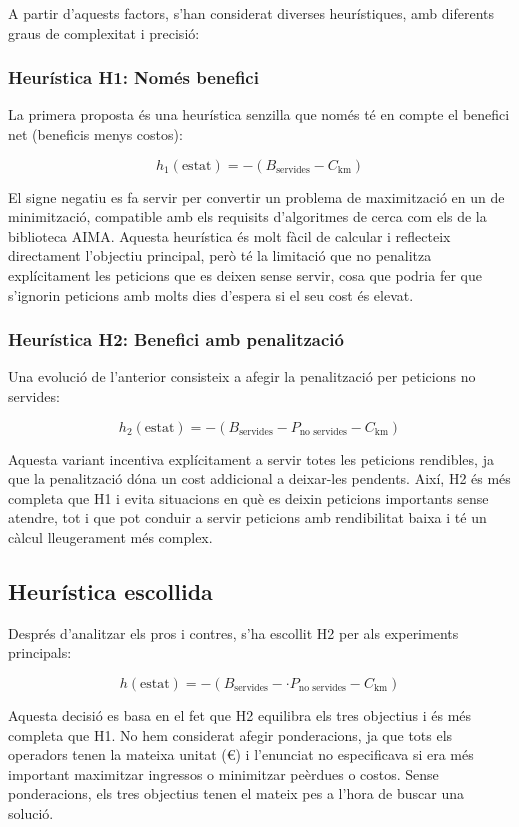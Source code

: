 A partir d’aquests factors, s’han considerat diverses heurístiques, amb diferents graus de complexitat i precisió:

\subsubsection{Heurística H1: Només benefici}

La primera proposta és una heurística senzilla que només té en compte el benefici net (beneficis menys costos):

\begin{equation}
h_1(\text{estat}) = -(B_{\text{servides}} - C_{\text{km}})
\end{equation}

El signe negatiu es fa servir per convertir un problema de maximització en un de minimització, compatible amb els requisits d’algoritmes de cerca com els de la biblioteca AIMA. Aquesta heurística és molt fàcil de calcular i reflecteix directament l’objectiu principal, però té la limitació que no penalitza explícitament les peticions que es deixen sense servir, cosa que podria fer que s’ignorin peticions amb molts dies d’espera si el seu cost és elevat.

\subsubsection{Heurística H2: Benefici amb penalització}

Una evolució de l’anterior consisteix a afegir la penalització per peticions no servides:

\begin{equation}
h_2(\text{estat}) = -(B_{\text{servides}} - P_{\text{no servides}} - C_{\text{km}})
\end{equation}

Aquesta variant incentiva explícitament a servir totes les peticions rendibles, ja que la penalització dóna un cost addicional a deixar-les pendents. Així, H2 és més completa que H1 i evita situacions en què es deixin peticions importants sense atendre, tot i que pot conduir a servir peticions amb rendibilitat baixa i té un càlcul lleugerament més complex.

\subsection{Heurística escollida}

Després d’analitzar els pros i contres, s’ha escollit H2 per als experiments principals:

\begin{equation}
h(\text{estat}) = -(B_{\text{servides}} - \cdot P_{\text{no servides}} - C_{\text{km}})
\end{equation}

Aquesta decisió es basa en el fet que H2 equilibra els tres objectius i és més completa que H1. No hem considerat afegir ponderacions, ja que tots els operadors tenen la mateixa unitat (€) i l'enunciat no especificava si era més important maximitzar ingressos o minimitzar peèrdues o costos. Sense ponderacions, els tres objectius tenen el mateix pes a l'hora de buscar una solució.
